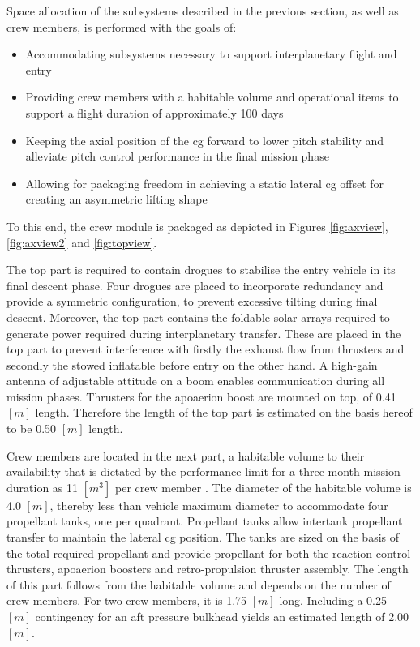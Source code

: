 Space allocation of the subsystems described in the previous section, as well as crew members, is performed with the goals of:
\begin{itemize}
\item Accommodating subsystems necessary to support interplanetary flight and entry
\item Providing crew members with a habitable volume and operational items to support a flight duration of approximately 100 days
\item Keeping the axial position of the \gls{cg} forward to lower pitch stability and alleviate pitch control performance in the final mission phase
\item Allowing for packaging freedom in achieving a static lateral \gls{cg} offset for creating an asymmetric lifting shape
\end{itemize}
To this end, the crew module is packaged as depicted in Figures \ref{fig:axview}, \ref{fig:axview2} and \ref{fig:topview}. 

The top part is required to contain drogues to stabilise the entry vehicle in its final descent phase. Four drogues are placed to incorporate redundancy and provide a symmetric configuration, to prevent excessive tilting during final descent. Moreover, the top part contains the foldable solar arrays required to generate power required during interplanetary transfer. These are placed in the top part to prevent interference with firstly the exhaust flow from thrusters and secondly the stowed inflatable before entry on the other hand. A high-gain antenna of adjustable attitude on a boom enables communication during all mission phases. Thrusters for the apoaerion boost are mounted on top, of 0.41 $[m]$ length. Therefore the length of the top part is estimated on the basis hereof to be 0.50 $[m]$ length.

Crew members are located in the next part, a habitable volume to their availability that is dictated by the performance limit for a three-month mission duration as 11 $[m^{3}]$ per crew member \cite{Rudisill2008}. The diameter of the habitable volume is 4.0 $[m]$, thereby less than vehicle maximum diameter to accommodate four propellant tanks, one per quadrant. Propellant tanks allow intertank propellant transfer to maintain the lateral \gls{cg} position. The tanks are sized on the basis of the total required propellant and provide propellant for both the reaction control thrusters, apoaerion boosters and retro-propulsion thruster assembly. The length of this part follows from the habitable volume and depends on the number of crew members. For two crew members, it is 1.75 $[m]$ long. Including a 0.25 $[m]$ contingency for an aft pressure bulkhead yields an estimated length of 2.00 $[m]$.

